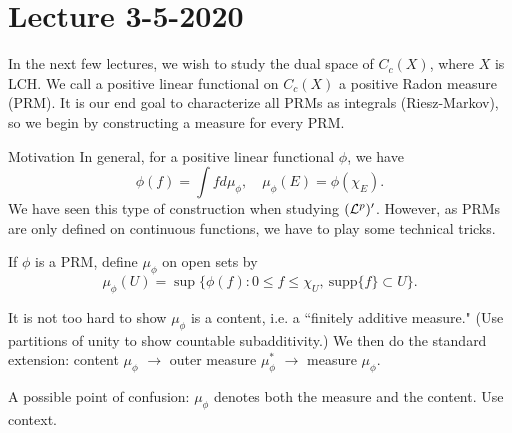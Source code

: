 \section{Lecture 3-5-2020}
In the next few lectures, we wish to study the dual space of $C_c(X)$, where $X$ is LCH. We call a positive linear functional on $C_c(X)$ a positive Radon measure (PRM). It is our end goal to characterize all PRMs as integrals (Riesz-Markov),
so we begin by constructing a measure for every PRM.
\begin{details}{Motivation}
    In general, for a positive linear functional $\phi$, we have
    \[
        \phi(f) = \int f d\mu_\phi, \quad \mu_\phi(E) = \phi(\chi_E).
    \]
    We have seen this type of construction when studying $({\mathcal L}^p)'$. However, as PRMs are only defined on continuous functions, we have to play some technical tricks.
\end{details}
\begin{dfn}
If $\phi$ is a PRM, define $\mu_\phi$ on open sets by
\[
    \mu_\phi(U) = \sup \{ \phi(f): 0 \leq f \leq \chi_U, \ \text{supp}\{f\} \subset U\}.
\]
\end{dfn}
It is not too hard to show $\mu_\phi$ is a content, i.e. a ``finitely additive measure." (Use partitions of unity to show countable subadditivity.) We then do the standard extension: content $\mu_\phi$ $ \rightarrow $ outer measure $\mu_\phi^*$ $ \rightarrow $ measure $\mu_\phi$.
\begin{remark}
A possible point of confusion: $\mu_\phi$ denotes both the measure and the content. Use context.
\end{remark}

